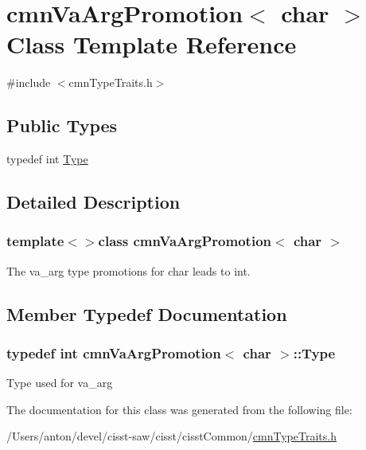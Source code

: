 \hypertarget{classcmn_va_arg_promotion_3_01char_01_4}{}\section{cmn\+Va\+Arg\+Promotion$<$ char $>$ Class Template Reference}
\label{classcmn_va_arg_promotion_3_01char_01_4}


{\ttfamily \#include $<$cmn\+Type\+Traits.\+h$>$}

\subsection*{Public Types}
\begin{DoxyCompactItemize}
\item 
typedef int \hyperlink{classcmn_va_arg_promotion_3_01char_01_4_a8732ccd3d1cdb55d42d07f96242f3c26}{Type}
\end{DoxyCompactItemize}


\subsection{Detailed Description}
\subsubsection*{template$<$$>$class cmn\+Va\+Arg\+Promotion$<$ char $>$}

The va\+\_\+arg type promotions for char leads to int. 

\subsection{Member Typedef Documentation}
\hypertarget{classcmn_va_arg_promotion_3_01char_01_4_a8732ccd3d1cdb55d42d07f96242f3c26}{}
\subsubsection[{Type}]{\setlength{\rightskip}{0pt plus 5cm}typedef int {\bf cmn\+Va\+Arg\+Promotion}$<$ char $>$\+::{\bf Type}}\label{classcmn_va_arg_promotion_3_01char_01_4_a8732ccd3d1cdb55d42d07f96242f3c26}
Type used for va\+\_\+arg 

The documentation for this class was generated from the following file\+:\begin{DoxyCompactItemize}
\item 
/\+Users/anton/devel/cisst-\/saw/cisst/cisst\+Common/\hyperlink{cmn_type_traits_8h}{cmn\+Type\+Traits.\+h}\end{DoxyCompactItemize}
